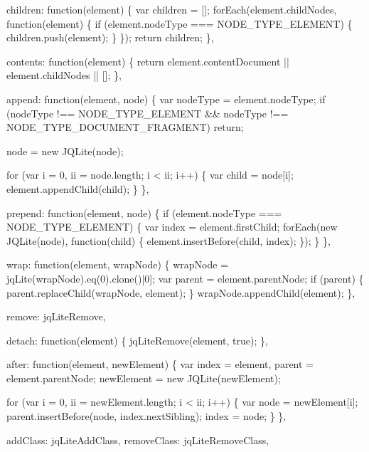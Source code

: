 \begin{DoxyCodeInclude}
{  children: \textcolor{keyword}{function}(element) \{
    var children = [];
    forEach(element.childNodes, \textcolor{keyword}{function}(element) \{
      if (element.nodeType === NODE\_TYPE\_ELEMENT) \{
        children.push(element);
      \}
    \});
    \textcolor{keywordflow}{return} children;
  \},

  contents: \textcolor{keyword}{function}(element) \{
    \textcolor{keywordflow}{return} element.contentDocument || element.childNodes || [];
  \},

  append: \textcolor{keyword}{function}(element, node) \{
    var nodeType = element.nodeType;
    \textcolor{keywordflow}{if} (nodeType !== NODE\_TYPE\_ELEMENT && nodeType !== NODE\_TYPE\_DOCUMENT\_FRAGMENT) \textcolor{keywordflow}{return};

    node = \textcolor{keyword}{new} JQLite(node);

    \textcolor{keywordflow}{for} (var i = 0, ii = node.length; i < ii; i++) \{
      var child = node[i];
      element.appendChild(child);
    \}
  \},

  prepend: \textcolor{keyword}{function}(element, node) \{
    \textcolor{keywordflow}{if} (element.nodeType === NODE\_TYPE\_ELEMENT) \{
      var index = element.firstChild;
      forEach(\textcolor{keyword}{new} JQLite(node), \textcolor{keyword}{function}(child) \{
        element.insertBefore(child, index);
      \});
    \}
  \},

  wrap: \textcolor{keyword}{function}(element, wrapNode) \{
    wrapNode = jqLite(wrapNode).eq(0).clone()[0];
    var parent = element.parentNode;
    \textcolor{keywordflow}{if} (parent) \{
      parent.replaceChild(wrapNode, element);
    \}
    wrapNode.appendChild(element);
  \},

  \textcolor{keyword}{remove}: jqLiteRemove,

  detach: \textcolor{keyword}{function}(element) \{
    jqLiteRemove(element, \textcolor{keyword}{true});
  \},

  after: \textcolor{keyword}{function}(element, newElement) \{
    var index = element, parent = element.parentNode;
    newElement = \textcolor{keyword}{new} JQLite(newElement);

    \textcolor{keywordflow}{for} (var i = 0, ii = newElement.length; i < ii; i++) \{
      var node = newElement[i];
      parent.insertBefore(node, index.nextSibling);
      index = node;
    \}
  \},

  addClass: jqLiteAddClass,
  removeClass: jqLiteRemoveClass,

}
\end{DoxyCodeInclude}
